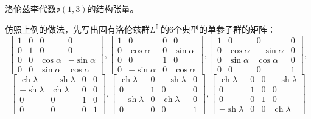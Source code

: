 \begin{example}
    洛伦兹李代数$\mathfrak{o}(1, 3)$的结构张量。

    仿照上例的做法，先写出固有洛伦兹群$L^\uparrow_+$的$6$个典型的单参子群的矩阵：
    $$\begin{bmatrix}
        1 & 0 & 0 & 0 \\
        0 & 1 & 0 & 0 \\
        0 & 0 & \cos\alpha & -\sin\alpha \\
        0 & 0 & \sin\alpha & \cos\alpha
    \end{bmatrix}, \begin{bmatrix}
        1 & 0 & 0 & 0 \\
        0 & \cos\alpha & 0 & \sin\alpha \\
        0 & 0 & 1 & 0 \\
        0 & -\sin\alpha & 0 & \cos\alpha
    \end{bmatrix}, \begin{bmatrix}
        1 & 0 & 0 & 0 \\
        0 & \cos\alpha & -\sin\alpha & 0 \\
        0 & \sin\alpha & \cos\alpha & 0 \\
        0 & 0 & 0 & 1
    \end{bmatrix},$$
    $$\begin{bmatrix}
        \operatorname{ch}\lambda & -\operatorname{sh}\lambda & 0 & 0 \\
        -\operatorname{sh}\lambda & \operatorname{ch}\lambda & 0 & 0 \\
        0 & 0 & 1 & 0 \\
        0 & 0 & 0 & 1
    \end{bmatrix}, \begin{bmatrix}
        \operatorname{ch}\lambda & 0 & -\operatorname{sh}\lambda & 0 \\
        0 & 1 & 0 & 0 \\
        -\operatorname{sh}\lambda & 0 & \operatorname{ch}\lambda & 0 \\
        0 & 0 & 0 & 1
    \end{bmatrix}, \begin{bmatrix}
        \operatorname{ch}\lambda & 0 & 0 & -\operatorname{sh}\lambda \\
        0 & 1 & 0 & 0 \\
        0 & 0 & 1 & 0 \\
        -\operatorname{sh}\lambda & 0 & 0 & \operatorname{ch}\lambda
    \end{bmatrix}$$

\end{example}
